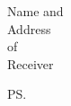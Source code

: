 \documentclass[a4paper,12pt]{letter}
\begin{document}
\begin{letter}{Name and \\ Address \\ of \\ Receiver}

\opening{} %



\closing{} %

\cc{} %
\encl{} %
\ps{} %

\end{letter}
\end{document}
